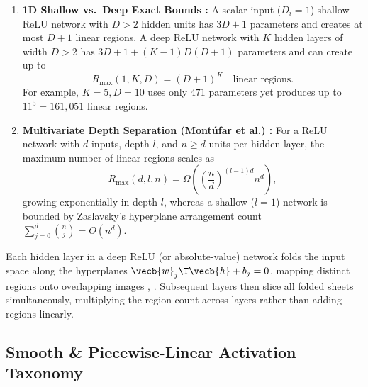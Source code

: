 \documentclass[../../../../master.tex]{subfiles}
\begin{document}
\begin{coremath}
\label{thm:mlpkan:regions}
\begin{enumerate}
  \item \textbf{1D Shallow vs.\ Deep Exact Bounds :} A scalar-input ($D_i = 1$) shallow ReLU network with $D > 2$ hidden units has $3D + 1$ parameters and creates at most $D + 1$ linear regions. A deep ReLU network with $K$ hidden layers of width $D > 2$ has $3D + 1 + (K-1)D(D+1)$ parameters and can create up to
  \begin{equation}
    \label{eq:mlpkan:1d_regions}
    R_{\max}(1, K, D) = (D + 1)^K \quad \text{linear regions.}
  \end{equation}
  For example, $K=5, D=10$ uses only $471$ parameters yet produces up to $11^5 = 161{,}051$ linear regions.
  \item \textbf{Multivariate Depth Separation (Mont\'ufar et al.) :} For a ReLU network with $d$ inputs, depth $l$, and $n \ge d$ units per hidden layer, the maximum number of linear regions scales as
  \begin{equation}
    \label{eq:mlpkan:montufar}
    R_{\max}(d, l, n) = \Omega\!\left(\left(\frac{n}{d}\right)^{(l-1)d} n^d\right),
  \end{equation}
  growing exponentially in depth $l$, whereas a shallow ($l=1$) network is bounded by Zaslavsky's hyperplane arrangement count $\sum_{j=0}^{d} \binom{n}{j} = O(n^d)$.
\end{enumerate}
\end{coremath}

\begin{intuition}
Each hidden layer in a deep ReLU (or absolute-value) network folds the input space along the hyperplanes $\vecb{w}_j\T \vecb{h} + b_j = 0$, mapping distinct regions onto overlapping images , . Subsequent layers then slice all folded sheets simultaneously, multiplying the region count across layers rather than adding regions linearly.
\end{intuition}

\subsection{Smooth \& Piecewise-Linear Activation Taxonomy}
\end{document}
